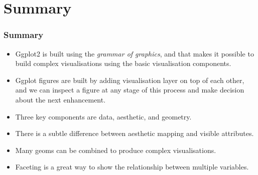 \documentclass{beamer}
\begin{document}
\section{Summary}
\begin{frame}\frametitle{Summary}
\begin{itemize}
\item Ggplot2 is built using the \textit{grammar of graphics}, and that makes it possible to build complex visualisations using the basic visualisation components.

\item Ggplot figures are built by adding visualisation layer on top of each other, and we can inspect a figure at any stage of this process and make decision about the next enhancement.

\item Three key components are data, aesthetic, and geometry.

\item There is a subtle difference between aesthetic mapping and visible attributes. 

\item Many geoms can be combined to produce complex visualisations.

\item Faceting is a great way to show the relationship between multiple variables.
\end{itemize}
\end{frame}
\end{document}
